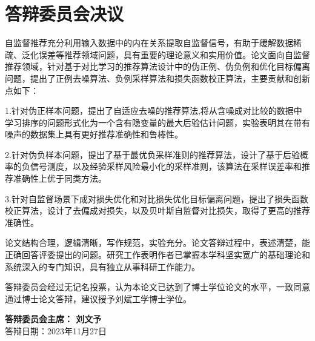\chapter{答辩委员会决议}
自监督推荐充分利用输入数据中的内在关系提取自监督信号，有助于缓解数据稀疏、泛化误差等推荐领域问题，具有重要的理论意义和实用价值。论文面向自监督推荐领域，针对基于对比学习的推荐算法设计中的伪正例、伪负例和优化目标偏离问题，提出了正例去噪算法、负例采样算法和损失函数校正算法，主要贡献和创新点如下：

1.针对伪正样本问题，提出了自适应去噪的推荐算法,将从含噪成对比较的数据中学习排序的问题形式化为一个含有隐变量的最大后验估计问题，实验表明其在带有噪声的数据集上具有更好推荐准确性和鲁棒性。

2.针对伪负样本问题，提出了基于最优负采样准则的推荐算法，设计了基于后验概率的负信号测度，以及经验采样风险最小化的采样准则，该算法在采样误差率和推荐准确性上优于同类方法。

3.针对自监督场景下成对损失优化和对比损失优化目标偏离问题，提出了损失函数校正算法，设计了去偏成对损失，以及贝叶斯自监督对比损失，取得了更高的推荐准确性。 

论文结构合理，逻辑清晰，写作规范，实验充分。论文答辩过程中，表述清楚，能正确回答评委提出的问题。研究工作表明作者已掌握本学科坚实宽广的基础理论和系统深入的专门知识，具有独立从事科研工作能力。

答辩委员会经过无记名投票，认为本论文已达到了博士学位论文的水平，一致同意通过博士论文答辩，建议授予刘斌工学博士学位。

\begin{flushright} 
\textbf{答辩委员会主席： 刘文予}\\
答辩日期：2023年11月27日
\end{flushright}




